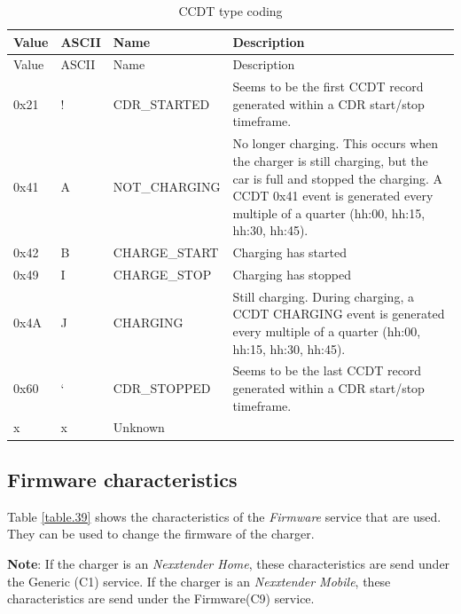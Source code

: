 \documentclass[a4paper]{article}
\begin{document}
\hfill\break

\begin{longtable}[]{@{}lllp{11cm}@{}}
	\caption{CCDT type coding}
	\label{table.64}
	\tabularnewline
	\toprule\noalign{}
	Value & ASCII & Name          & Description                                      \\
	\midrule\noalign{}
	\endfirsthead
	\toprule\noalign{}
	Value & ASCII & Name          & Description                                      \\
	\midrule\noalign{}
	\endhead
	\bottomrule\noalign{}
	\endlastfoot
	0x21  & !     & CDR\_STARTED  & Seems to be the first CCDT record generated      
	within a CDR start/stop timeframe. \\
	0x41  & A     & NOT\_CHARGING & No longer charging. This occurs when the         
	charger is still charging, but the car is full and stopped the charging.
	A CCDT 0x41 event is generated every multiple of a quarter (hh:00,
	hh:15, hh:30, hh:45). \\
	0x42  & B     & CHARGE\_START & Charging has started                             \\
	0x49  & I     & CHARGE\_STOP  & Charging has stopped                             \\
	0x4A  & J     & CHARGING      & Still charging. During charging, a CCDT CHARGING 
	event is generated every multiple of a quarter (hh:00, hh:15, hh:30,
	hh:45). \\
	0x60  & `     & CDR\_STOPPED  & Seems to be the last CCDT record generated       
	within a CDR start/stop timeframe. \\
	x     & x     & Unknown       &                                                  \\
\end{longtable}

\subsection{Firmware characteristics}
\label{firmware_characteristics}

Table \ref{table.39} shows the characteristics of the \emph{Firmware} service that are used.
They can be used to change the firmware of the charger. 

\textbf{Note}: If the charger is an \emph{Nexxtender Home}, 
these characteristics are send under the Generic (C1) service. 
If the charger is an \emph{Nexxtender Mobile}, 
these characteristics are send under the Firmware(C9) service.
\end{document}
